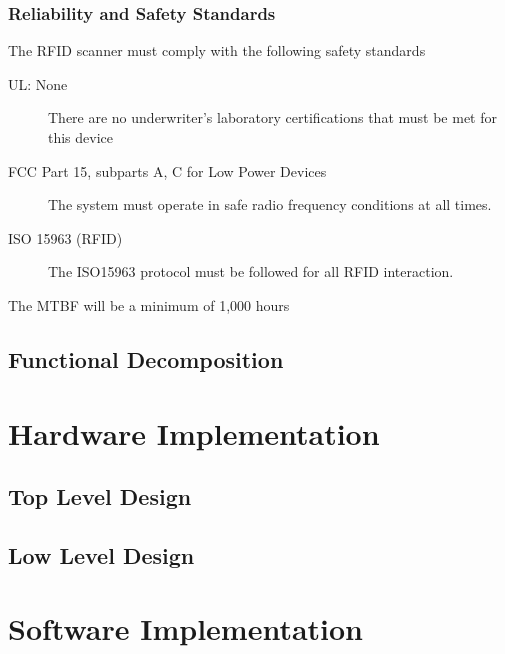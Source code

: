 \documentclass[12pt]{article} %
\begin{document}
\subsubsection{Reliability and Safety Standards}\label{safety}

The RFID scanner must comply with the following safety standards

\begin{description}
	\item[UL: None] There are no underwriter's laboratory certifications that must be met for this device 
	\item[FCC Part 15, subparts A, C for Low Power Devices]  The system must operate in safe radio frequency conditions at all times.
	\item[ISO 15963 (RFID)] The ISO15963 protocol must be followed for all RFID interaction.
\end{description}

The MTBF will be a minimum of 1,000 hours

\subsection{Functional Decomposition}\label{functions} %

\section{Hardware Implementation}\label{hwImplementation} 

\subsection{Top Level Design}\label{hwTopLevel} %

\subsection{Low Level Design}\label{hwLowLevel} %

\section{Software Implementation}\label{swImplementation}
%
%
\end{document}
